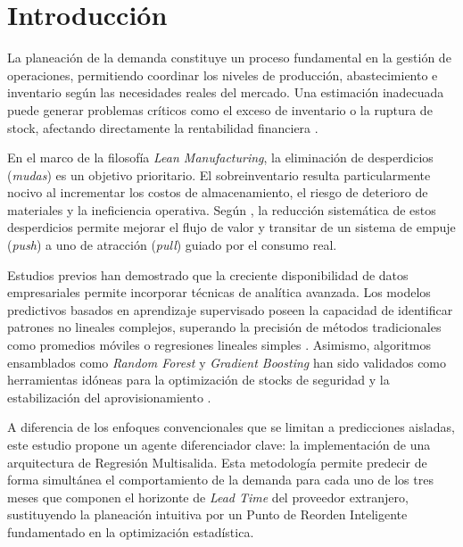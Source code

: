 \documentclass[conference,twoside]{IEEEtran}
\begin{document}
\IEEEpeerreviewmaketitle



\section{Introducción}

La planeación de la demanda constituye un proceso fundamental en la gestión de operaciones, permitiendo coordinar los niveles de producción, abastecimiento e inventario según las necesidades reales del mercado. Una estimación inadecuada puede generar problemas críticos como el exceso de inventario o la ruptura de stock, afectando directamente la rentabilidad financiera \cite{heizer2020operations}.

En el marco de la filosofía \textit{Lean Manufacturing}, la eliminación de desperdicios (\textit{mudas}) es un objetivo prioritario. El sobreinventario resulta particularmente nocivo al incrementar los costos de almacenamiento, el riesgo de deterioro de materiales y la ineficiencia operativa. Según \cite{womack2003lean}, la reducción sistemática de estos desperdicios permite mejorar el flujo de valor y transitar de un sistema de empuje (\textit{push}) a uno de atracción (\textit{pull}) guiado por el consumo real.

Estudios previos han demostrado que la creciente disponibilidad de datos empresariales permite incorporar técnicas de analítica avanzada. Los modelos predictivos basados en aprendizaje supervisado poseen la capacidad de identificar patrones no lineales complejos, superando la precisión de métodos tradicionales como promedios móviles o regresiones lineales simples \cite{geron2022hands}. Asimismo, algoritmos ensamblados como \textit{Random Forest} y \textit{Gradient Boosting} han sido validados como herramientas idóneas para la optimización de stocks de seguridad y la estabilización del aprovisionamiento \cite{chollet2021deep}.

A diferencia de los enfoques convencionales que se limitan a predicciones aisladas, este estudio propone un agente diferenciador clave: la implementación de una arquitectura de Regresión Multisalida. Esta metodología permite predecir de forma simultánea el comportamiento de la demanda para cada uno de los tres meses que componen el horizonte de \textit{Lead Time} del proveedor extranjero, sustituyendo la planeación intuitiva por un Punto de Reorden Inteligente fundamentado en la optimización estadística.
\end{document}

